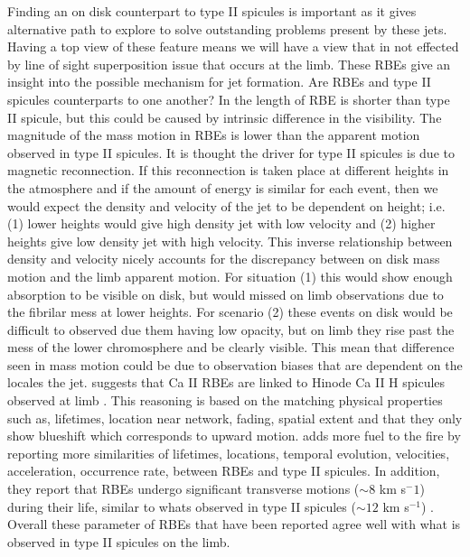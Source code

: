 \documentclass[12pt]{ociamthesis}
\begin{document}
\par Finding an on disk counterpart to type II spicules is important as it gives alternative path to explore to solve outstanding problems present by these jets. Having a top view of these feature means we will have a view that in not effected by line of sight superposition issue that occurs at the limb. These RBEs give an insight into the possible mechanism for jet formation. Are RBEs and type II spicules counterparts to one another? In \cite{Langangen2008ApJ} the length of RBE is shorter than type II spicule, but this could be caused by intrinsic difference in the visibility. The magnitude of the mass motion in RBEs is lower than the apparent motion observed in type II spicules. It is thought the driver for type II spicules is due to magnetic reconnection. If this reconnection is taken place at different heights in the atmosphere and if the amount of energy is similar for each event, then we would expect the density and velocity of the jet to be dependent on height; i.e. (1) lower heights would give high density jet with low velocity and (2) higher heights give low density jet with high velocity. This inverse relationship between density and velocity nicely accounts for the discrepancy between on disk mass motion and the limb apparent motion. For situation (1) this would show enough absorption to be visible on disk, but would missed on limb observations due to the fibrilar mess at lower heights. For scenario (2) these events on disk would be difficult to observed due them having low opacity, but on limb they rise past the mess of the lower chromosphere and be clearly visible. This mean that difference seen in mass motion could be due to observation biases that are dependent on the locales the jet. \cite{Langangen2008ApJ} suggests that Ca II RBEs are linked to Hinode Ca II H spicules observed at limb \cite{Pontieu2007PASJ}. This reasoning is based on the matching physical properties such as, lifetimes, location near network, fading, spatial extent and that they only show blueshift which corresponds to upward motion. \cite{Rouppe2009ApJ} adds more fuel to the fire by reporting more similarities of lifetimes, locations, temporal evolution, velocities, acceleration, occurrence rate, between RBEs and type II spicules. In addition, they report that RBEs undergo significant transverse motions ($\sim 8$ km s$^-1$) during their life, similar to whats observed in type II spicules ($\sim 12$ km s$^{-1}$) \cite{De_Pontieu2007}. Overall these parameter of RBEs that have been reported agree well with what is observed in type II spicules on the limb. \\                  
\end{document}
